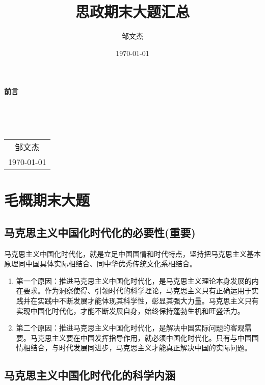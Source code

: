 \documentclass[12pt, a4paper, oneside]{ctexbook}
\title{{\Huge{\textbf{思政期末大题汇总}}}}
\author{邹文杰}
\date{\today}
\begin{document}
\maketitle

\setcounter{page}{1}

\begin{center}
    \Huge\textbf{前言}
\end{center}~\


~\\
\begin{flushright}
    \begin{tabular}{c}
        邹文杰\\
        \today
    \end{tabular}
\end{flushright}

\newpage
{}
\setcounter{page}{1}
\tableofcontents
\newpage
\setcounter{page}{1}

\chapter{毛概期末大题}

\section{马克思主义中国化时代化的必要性(重要)}

马克思主义中国化时代化，就是立足中国国情和时代特点，坚持把马克思主义基本原理同中国具体实际相结合、同中华优秀传统文化系相结合。

\begin{enumerate}[label=（\arabic*）]
\item 第一个原因：推进马克思主义中国化时代化，是马克思主义理论本身发展的内在要求。作为洞察使得、引领时代的科学理论，马克思主义只有正确运用于实践并在实践中不断发展才能体现其科学性，彰显其强大力量。马克思主义只有实现中国化时代化，才能不断发展自身，始终保持蓬勃生机和旺盛活力。
\item 第二个原因：推进马克思主义中国化时代化，是解决中国实际问题的客观需要。马克思主义要在中国发挥指导作用，就必须中国化时代化。只有与中国国情相结合，与时代发展同进步，马克思主义才能真正解决中国的实际问题。
\end{enumerate}

\section{马克思主义中国化时代化的科学内涵}
\end{document}
